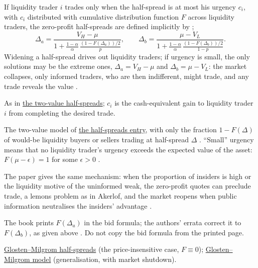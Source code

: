 \begin{qfresult}\label{res:glosten-milgrom-market-collapse}
 If liquidity trader $i$ trades only when the half-spread is at most his urgency $c_i$, with $c_i$ distributed with cumulative distribution function $F$ across liquidity traders, the zero-profit half-spreads are defined implicitly by \citep[chap.~``A Primer on the Microstructure of Financial Markets'', p.~37]{crypto-cartea}; \citep[entry for p.~37]{crypto-cartea-errata}
\[ \Delta_a=\frac{V_H-\mu}{1+\frac{1-\alpha}{\alpha}\,\frac{(1-F(\Delta_a))/2}{p}}, \qquad \Delta_b=\frac{\mu-V_L}{1+\frac{1-\alpha}{\alpha}\,\frac{(1-F(\Delta_b))/2}{1-p}}. \]
Widening a half-spread drives out liquidity traders; if urgency is small, the only solutions may be the extreme ones, $\Delta_a=V_H-\mu$ and $\Delta_b=\mu-V_L$: the market collapses, only informed traders, who are then indifferent, might trade, and any trade reveals the value \citep[chap.~``A Primer on the Microstructure of Financial Markets'', p.~37]{crypto-cartea}.

 As in \hyperref[res:glosten-milgrom-half-spreads]{the two-value half-spreads}; $c_i$ is the cash-equivalent gain to liquidity trader $i$ from completing the desired trade.

 The two-value model of \hyperref[res:glosten-milgrom-half-spreads]{the half-spreads entry}, with only the fraction $1-F(\Delta)$ of would-be liquidity buyers or sellers trading at half-spread $\Delta$ \citep[same chap., p.~37]{crypto-cartea}. ``Small'' urgency means that no liquidity trader's urgency exceeds the expected value of the asset: $F(\mu-\epsilon)=1$ for some $\epsilon>0$ \citep[same chap., p.~37, n.~5]{crypto-cartea}.

 The paper gives the same mechanism: when the proportion of insiders is high or the liquidity motive of the uninformed weak, the zero-profit quotes can preclude trade, a lemons problem as in Akerlof, and the market reopens when public information neutralises the insiders' advantage \citep[pp.~9 and~17]{glosten-milgrom-1983}.

 The book prints $F(\Delta_a)$ in the bid formula; the authors' errata correct it to $F(\Delta_b)$, as given above \citep[entry for p.~37]{crypto-cartea-errata}. Do not copy the bid formula from the printed page.

 \hyperref[res:glosten-milgrom-half-spreads]{Glosten--Milgrom half-spreads} (the price-insensitive case, $F\equiv0$); \hyperref[mod:glosten-milgrom]{Glosten--Milgrom model} (generalisation, with market shutdown).

\end{qfresult}

